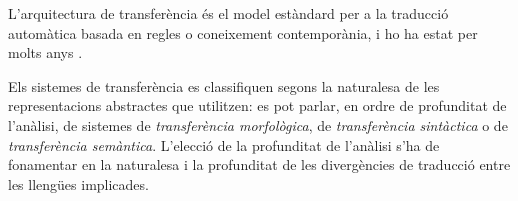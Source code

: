 
L'arquitectura de transferència és el model estàndard per a la
traducció automàtica basada en regles o coneixement contemporània, i
ho ha estat per molts anys \citep{arnold93j}.

Els sistemes de transferència es classifiquen segons la naturalesa de
les representacions abstractes que utilitzen: es pot parlar, en ordre
de profunditat de l'anàlisi, de sistemes de \emph{transferència
  morfològica}, de \emph{transferència sintàctica} o de {\em
  transferència semàntica}.  L'elecció de la profunditat de l'anàlisi
s'ha de fonamentar en la naturalesa i la profunditat de les
divergències de traducció \citep{vandooren93b} entre les llengües
implicades.

